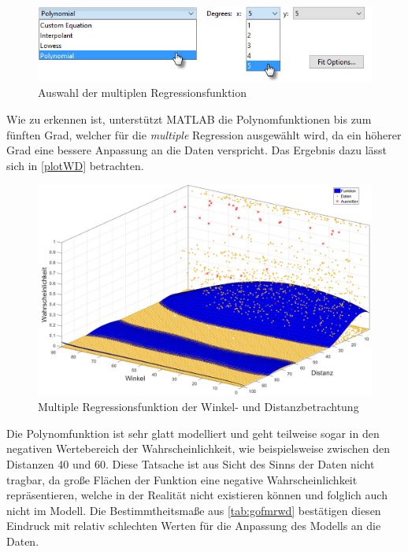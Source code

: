 \begin{figure}[H]
\centering
\includegraphics[scale=0.8]{se-wa-jpg/polyWD}
\caption{Auswahl der multiplen Regressionsfunktion}
\label{polyWD}
\end{figure}

Wie zu erkennen ist, unterstützt MATLAB die Polynomfunktionen bis zum fünften Grad, welcher für die \textit{multiple} Regression ausgewählt wird, da ein höherer Grad eine bessere Anpassung an die Daten verspricht. Das Ergebnis dazu lässt sich in \vref{plotWD} betrachten.

\begin{figure}[H]
\centering
\includegraphics[scale=0.34]{se-wa-jpg/plotWD}
\caption{Multiple Regressionsfunktion der Winkel- und Distanzbetrachtung}
\label{plotWD}
\end{figure}

Die Polynomfunktion ist sehr glatt modelliert und geht teilweise sogar in den negativen Wertebereich der Wahrscheinlichkeit, wie beispielsweise zwischen den Distanzen \textsf{40} und \textsf{60}. Diese Tatsache ist aus Sicht des Sinns der Daten nicht tragbar, da große Flächen der Funktion eine negative Wahrscheinlichkeit repräsentieren, welche in der Realität nicht existieren können und folglich auch nicht im Modell. Die Bestimmtheitsmaße aus \vref{tab:gofmrwd} bestätigen diesen Eindruck mit relativ schlechten Werten für die Anpassung des Modells an die Daten.

